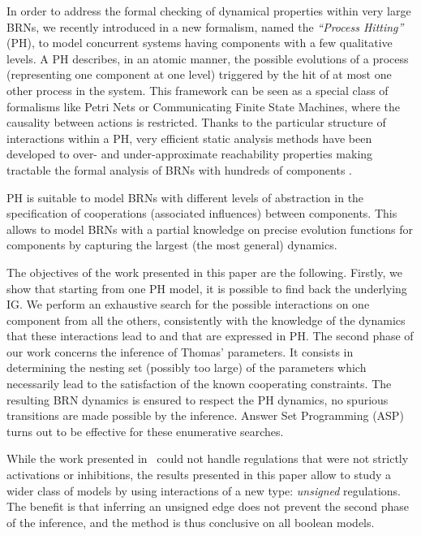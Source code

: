 In order to address the formal checking of dynamical properties within very large BRNs, we recently
introduced in \cite{PMR10-TCSB} a new formalism, named the \emph{``Process Hitting''} (PH), to model
concurrent systems having components with a few qualitative levels.
A PH describes, in an atomic manner, the possible evolutions of a process (representing one
component at one level) triggered by the hit of at most one other process in the system.
This framework can be seen as a special class of formalisms like Petri Nets or Communicating Finite
State Machines, where the causality between actions is restricted.
Thanks to the particular structure of interactions within a PH, very efficient static analysis
methods have been developed to over- and under-approximate reachability properties making tractable
the formal analysis of BRNs with hundreds of components \cite{PMR12-MSCS}.

PH is suitable to model BRNs with different levels of abstraction in the specification of
cooperations (associated influences) between components.
This allows to model BRNs with a partial knowledge on precise evolution functions for components
by capturing the largest (the most general) dynamics.

The objectives of the work presented in this paper are the following.
Firstly, we show that starting from one PH model, it is possible to find back the underlying IG.
We perform an exhaustive search for the possible interactions on one component from all the
others, consistently with the knowledge of the dynamics that these interactions lead to and that are
expressed in PH.
The second phase of our work concerns the inference of Thomas' parameters.
It consists in determining the nesting set (possibly too large) of the parameters which necessarily
lead to the satisfaction of the known cooperating constraints.
The resulting BRN dynamics is ensured to respect the PH dynamics, \ie no spurious transitions are
made possible by the inference.
Answer Set Programming (ASP) \cite{Baral03} turns out to be effective for these enumerative searches.

While the work presented in~\cite{FPIMR12-CMSB} could not handle regulations that were not strictly activations or inhibitions,
the results presented in this paper allow to study a wider class of models by using interactions of a new type: \emph{unsigned} regulations.
The benefit is that inferring an unsigned edge does not prevent the second phase of the inference,
and the method is thus conclusive on all boolean models.

